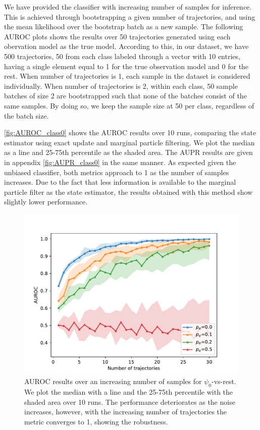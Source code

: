 We have provided the classifier with increasing number of samples for inference. This is achieved through bootstrapping a given number of trajectories, and using the mean likelihood over the bootstrap batch as a new sample. The following AUROC plots shows the results over 50 trajectories generated using each obervation model as the true model. According to this, in our dataset, we have 500 trajectories, 50 from each class labeled through a vector with 10 entries, having a single element equal to 1 for the true observation model and 0 for the rest. When number of trajectories is 1, each sample in the dataset is considered individually. When number of trajectories is 2, within each class, 50 sample batches of size 2 are bootstrapped such that none of the batches consist of the same samples. By doing so, we keep the sample size at 50 per class, regardless of the batch size. \par
\autoref{fig:AUROC_class0} shows the AUROC results over 10 runs, comparing the state estimator using exact update and marginal particle filtering. We plot the median as a line and 25-75th percentile as the shaded area. The AUPR results are given in appendix \autoref{fig:AUPR_class0} in the same manner. As expected given the unbiased classifier, both metrics approach to 1 as the number of samples increases. Due to the fact that less information is available to the marginal particle filter as the state estimator, the results obtained with this method show slightly lower performance. 

\begin{figure}[t]
	\begin{center}
		\includegraphics[width=.75\textwidth]{figures/roc_analysis/error_AUROC_perc_0}
		\caption[AUROC results over an increasing number of samples with different error probability $ p_e $]{AUROC results over an increasing number of samples for $ \psi_0 $-vs-rest. We plot the median with a line and the 25-75th percentile with the shaded area over 10 runs. The performance deteriorates as the noise increases, however, with the increasing number of trajectories the metric converges to 1, showing the robustness.}
		\label{fig:AUROC_class0_error}
	\end{center}
\end{figure}
